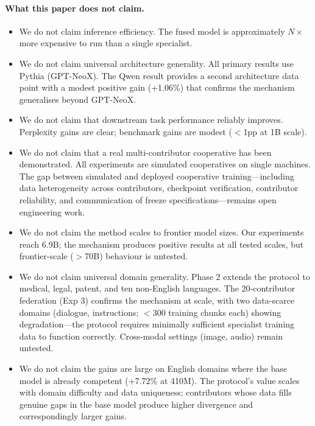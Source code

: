 \documentclass{article}
\begin{document}
\paragraph{What this paper does not claim.}
\begin{itemize}[leftmargin=*, itemsep=1pt]
  \item We do not claim inference efficiency. The fused model is approximately $N\times$ more expensive to run than a single specialist.
  \item We do not claim universal architecture generality. All primary results use Pythia (GPT-NeoX). The Qwen result provides a second architecture data point with a modest positive gain (+1.06\%) that confirms the mechanism generalises beyond GPT-NeoX.
  \item We do not claim that downstream task performance reliably improves. Perplexity gains are clear; benchmark gains are modest ($<$1pp at 1B scale).
  \item We do not claim that a real multi-contributor cooperative has been demonstrated. All experiments are simulated cooperatives on single machines. The gap between simulated and deployed cooperative training---including data heterogeneity across contributors, checkpoint verification, contributor reliability, and communication of freeze specifications---remains open engineering work.
  \item We do not claim the method scales to frontier model sizes. Our experiments reach 6.9B; the mechanism produces positive results at all tested scales, but frontier-scale ($>$70B) behaviour is untested.
  \item We do not claim universal domain generality. Phase 2 extends the protocol to medical, legal, patent, and ten non-English languages. The 20-contributor federation (Exp 3) confirms the mechanism at scale, with two data-scarce domains (dialogue, instructions; ${<}$300 training chunks each) showing degradation---the protocol requires minimally sufficient specialist training data to function correctly. Cross-modal settings (image, audio) remain untested.
  \item We do not claim the gains are large on English domains where the base model is already competent (+7.72\% at 410M). The protocol's value scales with domain difficulty and data uniqueness; contributors whose data fills genuine gaps in the base model produce higher divergence and correspondingly larger gains.
\end{itemize}

\end{document}
